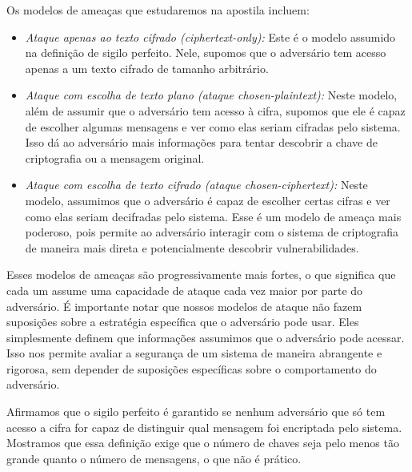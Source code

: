 Os modelos de ameaças que estudaremos na apostila incluem:
\begin{itemize}
\item[] {\em Ataque apenas ao texto cifrado (ciphertext-only):} 
  Este é o modelo assumido na definição de sigilo perfeito.
  Nele, supomos que o adversário tem acesso apenas a um texto cifrado de tamanho arbitrário.
\item[] {\em Ataque com escolha de texto plano (ataque chosen-plaintext):}
  Neste modelo, além de assumir que o adversário tem acesso à cifra, supomos que ele é capaz de escolher algumas mensagens e ver como elas seriam cifradas pelo sistema.
  Isso dá ao adversário mais informações para tentar descobrir a chave de criptografia ou a mensagem original.
\item[] {\em Ataque com escolha de texto cifrado (ataque chosen-ciphertext):}
  Neste modelo, assumimos que o adversário é capaz de escolher certas cifras e ver como elas seriam decifradas pelo sistema.
  Esse é um modelo de ameaça mais poderoso, pois permite ao adversário interagir com o sistema de criptografia de maneira mais direta e potencialmente descobrir vulnerabilidades.
\end{itemize}

Esses modelos de ameaças são progressivamente mais fortes, o que significa que cada um assume uma capacidade de ataque cada vez maior por parte do adversário.
É importante notar que nossos modelos de ataque não fazem suposições sobre a estratégia específica que o adversário pode usar.
Eles simplesmente definem que informações assumimos que o adversário pode acessar.
Isso nos permite avaliar a segurança de um sistema de maneira abrangente e rigorosa, sem depender de suposições específicas sobre o comportamento do adversário.

Afirmamos que o sigilo perfeito é garantido se nenhum adversário que só tem acesso a cifra for capaz de distinguir qual mensagem foi encriptada pelo sistema.
Mostramos que essa definição exige que o número de chaves seja pelo menos tão grande quanto o número de mensagens, o que não é prático.

